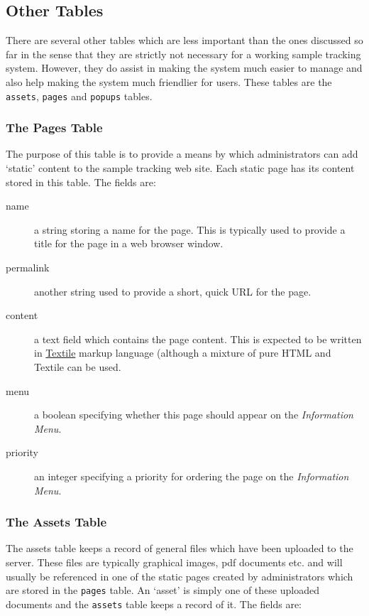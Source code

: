 \documentclass[12pt]{article}
\begin{document}
\subsection{Other Tables}
There are several other tables which are less important than the ones 
discussed so far in the sense that they are strictly not necessary for
a working sample tracking system. However, they do assist in making the
system much easier to manage and also help making the system much
friendlier for users. These tables are the \verb=assets=, \verb=pages=
and \verb=popups= tables.

\subsubsection{The Pages Table}
The purpose of this table is to provide a means by which administrators can
add `static' content to the sample tracking web site. Each static page has
its content stored in this table. The fields are:

\begin{description}
\item[name]
a string storing a name for the page. This is typically used to provide
a title for the page in a web browser window.
\item[permalink]
another string used to provide a short, quick URL for the page.
\item[content]
a text field which contains the page content. This is expected to be written
in  \href{http://en.wikipedia.org/wiki/Textile_%28markup_language%29}{Textile}
markup language (although a mixture of pure HTML and Textile can be used.
\item[menu]
a boolean specifying whether this page should appear on the
\emph{Information Menu}.
\item[priority]
an integer specifying a priority for ordering the page on the
\emph{Information Menu}.
\end{description}

\subsubsection{The Assets Table}
The assets table keeps a record of general files which have been uploaded
to the server. These files are typically graphical images, pdf documents etc.
and will usually be referenced in one of the static pages created by
administrators which are stored in the \verb=pages= table. An `asset' is
simply one of these uploaded documents and the \verb=assets= table keeps
a record of it. The fields are:
\end{document}
